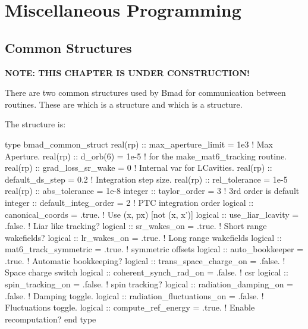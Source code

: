 \chapter{Miscellaneous Programming}

\section{Common Structures}
\label{s:common_struct}


{\bf NOTE: THIS CHAPTER IS UNDER CONSTRUCTION!}

There are two common structures used by Bmad for communication between
routines. These are  which is a 
structure and  which is a 
structure.

The  structure is:
\begin{example}
  type bmad_common_struct
    real(rp) :: max_aperture_limit = 1e3       ! Max Aperture.
    real(rp) :: d_orb(6)           = 1e-5      ! for the make_mat6_tracking routine.
    real(rp) :: grad_loss_sr_wake  = 0         ! Internal var for LCavities.
    real(rp) :: default_ds_step    = 0.2       ! Integration step size.  
    real(rp) :: rel_tolerance = 1e-5
    real(rp) :: abs_tolerance = 1e-8
    integer :: taylor_order = 3                ! 3rd order is default
    integer :: default_integ_order = 2         ! PTC integration order
    logical :: canonical_coords = .true.       ! Use (x, px) [not (x, x')]
    logical :: use_liar_lcavity = .false.      ! Liar like tracking?
    logical :: sr_wakes_on = .true.            ! Short range wakefields?
    logical :: lr_wakes_on = .true.            ! Long range wakefields
    logical :: mat6_track_symmetric = .true.   ! symmetric offsets
    logical :: auto_bookkeeper = .true.        ! Automatic bookkeeping?
    logical :: trans_space_charge_on = .false. ! Space charge switch
    logical :: coherent_synch_rad_on = .false. ! csr 
    logical :: spin_tracking_on = .false.      ! spin tracking?
    logical :: radiation_damping_on = .false.       ! Damping toggle.
    logical :: radiation_fluctuations_on = .false.  ! Fluctuations toggle.
    logical :: compute_ref_energy = .true.          ! Enable recomputation?
  end type
\end{example}


